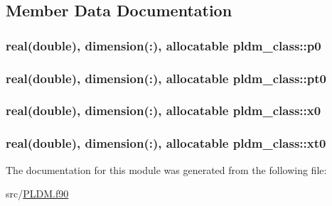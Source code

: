 \subsection{Member Data Documentation}
\hypertarget{classpldm__class_a4da9c01c7e463087a5f38764804dd0eb}{
\subsubsection[{p0}]{\setlength{\rightskip}{0pt plus 5cm}real(double), dimension(\+:), allocatable pldm\+\_\+class\+::p0\hspace{0.3cm}{\ttfamily [private]}}}\label{classpldm__class_a4da9c01c7e463087a5f38764804dd0eb}
\hypertarget{classpldm__class_a6f0729e807a28fab99053667439c375c}{
\subsubsection[{pt0}]{\setlength{\rightskip}{0pt plus 5cm}real(double), dimension(\+:), allocatable pldm\+\_\+class\+::pt0\hspace{0.3cm}{\ttfamily [private]}}}\label{classpldm__class_a6f0729e807a28fab99053667439c375c}
\hypertarget{classpldm__class_a66ae11e24219b080698059a797561bb4}{
\subsubsection[{x0}]{\setlength{\rightskip}{0pt plus 5cm}real(double), dimension(\+:), allocatable pldm\+\_\+class\+::x0\hspace{0.3cm}{\ttfamily [private]}}}\label{classpldm__class_a66ae11e24219b080698059a797561bb4}
\hypertarget{classpldm__class_a2f8d09296fcb6d486fb5a87e5a13276b}{
\subsubsection[{xt0}]{\setlength{\rightskip}{0pt plus 5cm}real(double), dimension(\+:), allocatable pldm\+\_\+class\+::xt0\hspace{0.3cm}{\ttfamily [private]}}}\label{classpldm__class_a2f8d09296fcb6d486fb5a87e5a13276b}


The documentation for this module was generated from the following file\+:\begin{DoxyCompactItemize}
\item 
src/\hyperlink{_p_l_d_m_8f90}{P\+L\+D\+M.\+f90}\end{DoxyCompactItemize}
